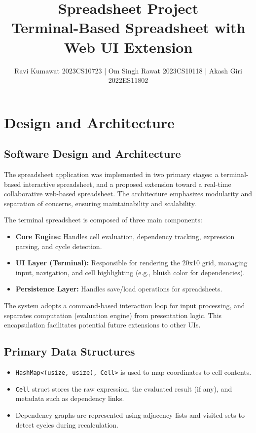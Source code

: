 \documentclass[11pt]{article}
\title{Spreadsheet Project \\ \large Terminal-Based Spreadsheet with Web UI Extension}
\author{Ravi Kumawat 2023CS10723 | Om Singh Rawat 2023CS10118 | Akash Giri 2022ES11802}
\date{}
\begin{document}
\maketitle

\section{Design and Architecture}

\subsection{Software Design and Architecture}

The spreadsheet application was implemented in two primary stages: a terminal-based interactive spreadsheet, and a proposed extension toward a real-time collaborative web-based spreadsheet. The architecture emphasizes modularity and separation of concerns, ensuring maintainability and scalability.

The terminal spreadsheet is composed of three main components:
\begin{itemize}
    \item \textbf{Core Engine:} Handles cell evaluation, dependency tracking, expression parsing, and cycle detection.
    \item \textbf{UI Layer (Terminal):} Responsible for rendering the 20x10 grid, managing input, navigation, and cell highlighting (e.g., bluish color for dependencies).
    \item \textbf{Persistence Layer:} Handles save/load operations for spreadsheets.
\end{itemize}

The system adopts a command-based interaction loop for input processing, and separates computation (evaluation engine) from presentation logic. This encapsulation facilitates potential future extensions to other UIs.

\subsection{Primary Data Structures}

\begin{itemize}
    \item \texttt{HashMap<(usize, usize), Cell>} is used to map coordinates to cell contents.
    \item \texttt{Cell} struct stores the raw expression, the evaluated result (if any), and metadata such as dependency links.
    \item Dependency graphs are represented using adjacency lists and visited sets to detect cycles during recalculation.
\end{itemize}
\end{document}
